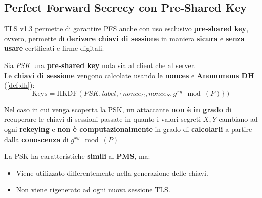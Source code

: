 \subsection{Perfect Forward Secrecy con Pre-Shared Key}
TLS v1.3 permette di garantire PFS anche con uso esclusivo \textbf{pre-shared key}, ovvero, permette di \textbf{derivare chiavi di sessione} in maniera \textbf{sicura} e \textbf{senza usare} certificati e firme digitali.
\begin{theorem}
Sia $PSK$ una \textbf{pre-shared key} nota sia al client che al server. \footnotemark \\
Le \textbf{chiavi di sessione} vengono calcolate usando le \textbf{nonces} e \textbf{Anonumous DH} (\cref{def:dh}):
\[\text{Keys}=\text{HKDF}(PSK,label,\{nonce_C,nonce_S,g^{xy}\mod(P)\})\]
\end{theorem}
\begin{note}
Nel caso in cui venga scoperta la PSK, un attaccante \textbf{non è in grado} di recuperare le chiavi di sessioni passate in quanto i valori segreti $X,Y$ cambiano ad ogni \textbf{rekeying} e \textbf{non è computazionalmente} in grado di \textbf{calcolarli} a partire dalla \textbf{conoscenza} di $g^{xy}\mod(P)$
\end{note}
\begin{note}
La PSK ha caratteristiche \textbf{simili} al \textbf{PMS}, ma:
\begin{itemize}
    \item Viene utilizzato differentemente nella generazione delle chiavi.
    \item Non viene rigenerato ad ogni nuova sessione TLS.
\end{itemize}
\end{note}
